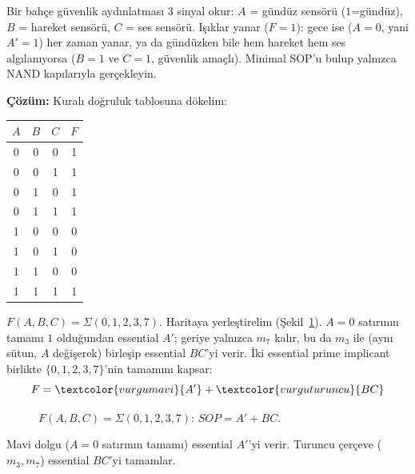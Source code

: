 \begin{alistirma}[\orta]
Bir bahçe güvenlik aydınlatması $3$ sinyal okur: $A$ = gündüz sensörü ($1$=gündüz), $B$ =
hareket sensörü, $C$ = ses sensörü. Işıklar yanar ($F=1$): gece ise ($A=0$, yani $A'=1$)
her zaman yanar, ya da gündüzken bile hem hareket hem ses algılanıyorsa ($B=1$ ve $C=1$,
güvenlik amaçlı). Minimal SOP'u bulup yalnızca NAND kapılarıyla gerçekleyin.

\textbf{Çözüm:} Kuralı doğruluk tablosuna dökelim:
\begin{center}
\begin{tabular}{ccc|c}
\toprule
$A$&$B$&$C$&$F$\\
\midrule
0&0&0&1\\
0&0&1&1\\
0&1&0&1\\
0&1&1&1\\
1&0&0&0\\
1&0&1&0\\
1&1&0&0\\
1&1&1&1\\
\bottomrule
\end{tabular}
\end{center}
$F(A,B,C)=\Sigma(0,1,2,3,7)$. Haritaya yerleştirelim (Şekil~\ref{fig:kmap-alistirma12}).
$A=0$ satırının tamamı $1$ olduğundan essential $A'$; geriye yalnızca $m_7$ kalır, bu da
$m_3$ ile (aynı sütun, $A$ değişerek) birleşip essential $BC$'yi verir. İki essential
prime implicant birlikte $\{0,1,2,3,7\}$'nin tamamını kapsar:
\[
F = \textcolor{vurgumavi}{A'} + \textcolor{vurguturuncu}{BC}
\]

\begin{figure}[H]
\centering
{}
\caption{$F(A,B,C)=\Sigma(0,1,2,3,7)$: $SOP=A'+BC$.}
\label{fig:kmap-alistirma12}
\end{figure}
Mavi dolgu ($A=0$ satırının tamamı) essential $A'$'yi verir. Turuncu çerçeve ($m_3,m_7$)
essential $BC$'yi tamamlar.


\end{alistirma}
